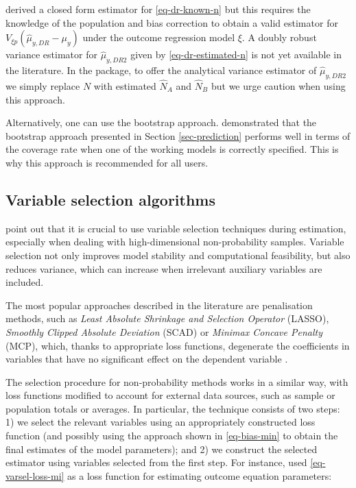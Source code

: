 \documentclass[
]{jss}
\begin{document}
\citet{yang_doubly_2020} derived a closed form estimator for
\eqref{eq-dr-known-n} but this requires the knowledge of the population
and bias correction to obtain a valid estimator for
\(V_{\xi p}\left(\hat{\mu}_{y,DR}-\mu_y\right)\) under the outcome
regression model \(\xi\). A doubly robust variance estimator for
\(\hat{\mu}_{y,DR2}\) given by \eqref{eq-dr-estimated-n} is not yet
available in the literature. In the package, to offer the analytical
variance estimator of \(\hat{\mu}_{y,DR2}\) we simply replace \(N\) with
estimated \(\hat{N}_A\) and \(\hat{N}_B\) but we urge caution when using
this approach.

Alternatively, one can use the bootstrap approach.
\citet{chen2020doubly} demonstrated that the bootstrap approach
presented in Section \ref{sec-prediction} performs well in terms of the
coverage rate when one of the working models is correctly specified.
This is why this approach is recommended for all users.

\subsection{Variable selection algorithms}\label{sec-varsel}

\citet{yang_asymptotic_2020} point out that it is crucial to use
variable selection techniques during estimation, especially when dealing
with high-dimensional non-probability samples. Variable selection not
only improves model stability and computational feasibility, but also
reduces variance, which can increase when irrelevant auxiliary variables
are included.

The most popular approaches described in the literature are penalisation
methods, such as
\textit{Least Absolute Shrinkage and Selection Operator} (LASSO),
\textit{Smoothly Clipped Absolute Deviation} (SCAD) or
\textit{Minimax Concave Penalty} (MCP), which, thanks to appropriate
loss functions, degenerate the coefficients in variables that have no
significant effect on the dependent variable
\citep[cf.][]{tibshirani1996regression, ncvreg}.

The selection procedure for non-probability methods works in a similar
way, with loss functions modified to account for external data sources,
such as sample or population totals or averages. In particular, the
technique consists of two steps: 1) we select the relevant variables
using an appropriately constructed loss function (and possibly using the
approach shown in \eqref{eq-bias-min} to obtain the final estimates of
the model parameters); and 2) we construct the selected estimator using
variables selected from the first step. For instance,
\citet{yang_doubly_2020} used \eqref{eq-varsel-loss-mi} as a loss
function for estimating outcome equation parameters:
\end{document}
